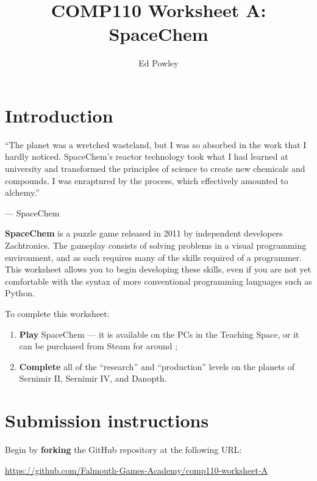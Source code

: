 \documentclass{../../../fal_assignment}
\title{COMP110 Worksheet A: SpaceChem}
\author{Ed Powley}
\begin{document}
\maketitle

\section*{Introduction}

\begin{marginquote}
``The planet was a wretched wasteland, but I was so absorbed in the work that I hardly noticed. SpaceChem's reactor technology took what I had learned at university and transformed the principles of science to create new chemicals and compounds. I was enraptured by the process, which effectively amounted to alchemy.''

--- SpaceChem
\end{marginquote}

\textbf{SpaceChem} is a puzzle game released in 2011 by independent developers Zachtronics. The gameplay consists of solving problems in a visual programming environment, and as such requires many of the skills required of a programmer. This worksheet allows you to begin developing these skills, even if you are not yet comfortable with the syntax of more conventional programming languages such as Python.

To complete this worksheet:
\begin{enumerate}[label=(\alph*)]
	\item \textbf{Play} SpaceChem --- it is available on the PCs in the Teaching Space,
		or it can be purchased from Steam for around ;
 	\item \textbf{Complete} all of the ``research'' and ``production'' levels on the planets of Sernimir II, Sernimir IV, and Danopth.
\end{enumerate}

\section*{Submission instructions}

Begin by \textbf{forking} the GitHub repository at the following URL:

\url{https://github.com/Falmouth-Games-Academy/comp110-worksheet-A}
\end{document}
